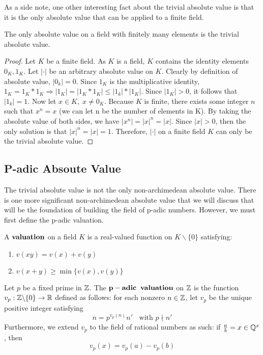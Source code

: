 \documentclass[a4paper]{article}
\begin{document}
As a side note, one other interesting fact about the trivial absolute
value is that it is the only absolute value that can be applied to a
finite field.

\begin{theorem}
  The only absolute value on a field with finitely many elements
  is the trivial absolute value.
\end{theorem}
\begin{proof}
  Let \(K\) be a finite field.  As \(K\) is a field, \(K\) 
  contains the identity elements \(0_K,1_K\).  Let \(|\cdot|\) be
  an arbitrary absolute value on \(K\).  Clearly by definition of
  absolute value, \(|0_k|=0\).  Since \(1_K\) is the
  multiplicative identity, \(1_K=1_K*1_K\Rightarrow|1_K|=
  |1_K*1_K|\leq|1_k|*|1_K|\).  Since \(|1_K|>0\), it follows
  that \(|1_k|=1\).  Now let \(x\in K,\;x\neq0_K\).  Because \(K\)
  is finite, there exists some integer \(n\) such that 
  \(x^n=x\) (we can let n be the number of elements in K).  By 
  taking the absolute value of both sides, we have 
  \(|x^n|=|x|^n=|x|\).  Since \(|x|>0\), then the only solution is
  that \(|x|^n=|x|=1\).  Therefore, \(|\cdot|\) on a finite field
  \(K\) can only be the trivial absolute value.
\end{proof}

\subsection{P-adic Absoute Value}

The trivial absolute value is not the only non-archimedean
absolute value.  There is one more significant non-archimedean
absolute value that we will discuss that will be the 
foundation of building the field of p-adic numbers.  However, we
must first define the p-adic valuation.

\begin{definition}[Valuation]
A $\bf{valuation}$ on a field $K$ is a real-valued function on
$K\backslash\{0\}$ satisfying:
\begin{enumerate}
  \item $v(xy)=v(x)+v(y)$
  \item $v(x+y)\geq\min\{v(x),v(y)\}$
\end{enumerate}
\end{definition}

\begin{definition}
  Let $p$ be a fixed prime in $\mathbb Z$. The 
  \(\bf{p-adic\;\; valuation}\) on \(\mathbb Z\) is the function 
  \(v_p:\mathbb Z\backslash\{0\}\to\mathbb R\) defined as follows: for
  each nonzero \(n\in\mathbb Z\), let $v_p$ be the unique positive
  integer satisfying
  \[
  	n=p^{v_p(n)}n'\;\;
    \text{ with }p\nmid n'
  \]
  Furthermore, we extend $v_p$ to the field of rational numbers as 
  such: if \(\frac{a}{b}=x\in\mathbb Q^x\), then
  \[
    v_p(x)=v_p(a)-v_p(b)
  \]
\end{definition}
\end{document}
